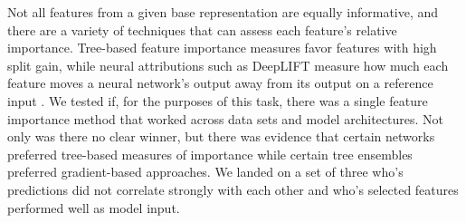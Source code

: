 

Not all features from a given base representation are equally informative, and there are a variety of techniques that can assess each feature's relative importance. Tree-based feature importance measures favor features with high split gain, while neural attributions such as DeepLIFT measure how much each feature moves a neural network's output away from its output on a reference input \citep{Strobl2007, Ancona2018}.
We tested if, for the purposes of this task, there was a single feature importance method that worked across data sets and model architectures. Not only was there no clear winner, but there was evidence that certain networks preferred tree-based measures of importance while certain tree ensembles preferred gradient-based approaches. We landed on a set of three who's predictions did not correlate strongly with each other and who's selected features performed well as model input.

